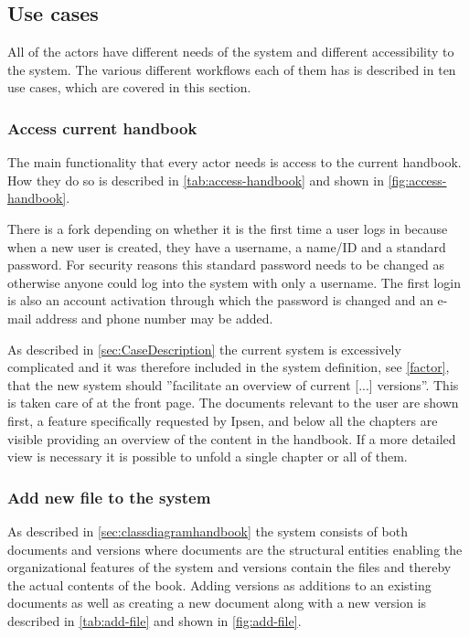 \subsection{Use cases} \label{sec:usecases}
All of the actors have different needs of the system and different accessibility to the system. The various different workflows each of them has is described in ten use cases, which are covered in this section.
\subsubsection{Access current handbook}



The main functionality that every actor needs is access to the current handbook. How they do so is described in \cref{tab:access-handbook} and shown in \cref{fig:access-handbook}.




There is a fork depending on whether it is the first time a user logs in because when a new user is created, they have a username, a name/ID and a standard password.
For security reasons this standard password needs to be changed as otherwise anyone could log into the system with only a username.
The first login is also an account activation through which the password is changed and an e-mail address and phone number may be added.

As described in \cref{sec:CaseDescription} the current system is excessively complicated and it was therefore included in the system definition, see \cref{factor}, that the new system should ''facilitate an overview of current [...] versions''.
This is taken care of at the front page.
The documents relevant to the user are shown first, a feature specifically requested by Ipsen, and below all the chapters are visible providing an overview of the content in the handbook.
If a more detailed view is necessary it is possible to unfold a single chapter or all of them.


\subsubsection{Add new file to the system}
As described in \cref{sec:classdiagramhandbook} the system consists of both documents and versions where documents are the structural entities enabling the organizational features of the system and versions contain the files and thereby the actual contents of the book.
Adding versions as additions to an existing documents as well as creating a new document along with a new version is described in \cref{tab:add-file} and shown in \cref{fig:add-file}.


